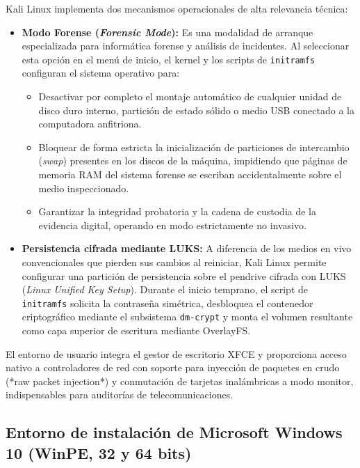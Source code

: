 \documentclass[12pt]{article}
\begin{document}
Kali Linux implementa dos mecanismos operacionales de alta relevancia técnica:
\begin{itemize}[noitemsep, topsep=2pt]
    \item \textbf{Modo Forense (\textit{Forensic Mode}):} Es una modalidad de arranque especializada para informática forense y análisis de incidentes. Al seleccionar esta opción en el menú de inicio, el kernel y los scripts de \texttt{initramfs} configuran el sistema operativo para:
    \begin{itemize}[noitemsep, topsep=1pt]
        \item Desactivar por completo el montaje automático de cualquier unidad de disco duro interno, partición de estado sólido o medio USB conectado a la computadora anfitriona.
        \item Bloquear de forma estricta la inicialización de particiones de intercambio (\textit{swap}) presentes en los discos de la máquina, impidiendo que páginas de memoria RAM del sistema forense se escriban accidentalmente sobre el medio inspeccionado.
        \item Garantizar la integridad probatoria y la cadena de custodia de la evidencia digital, operando en modo estrictamente no invasivo.
    \end{itemize}
    \item \textbf{Persistencia cifrada mediante LUKS:} A diferencia de los medios en vivo convencionales que pierden sus cambios al reiniciar, Kali Linux permite configurar una partición de persistencia sobre el pendrive cifrada con LUKS (\textit{Linux Unified Key Setup}). Durante el inicio temprano, el script de \texttt{initramfs} solicita la contraseña simétrica, desbloquea el contenedor criptográfico mediante el subsistema \texttt{dm-crypt} y monta el volumen resultante como capa superior de escritura mediante OverlayFS.
\end{itemize}

El entorno de usuario integra el gestor de escritorio XFCE y proporciona acceso nativo a controladores de red con soporte para inyección de paquetes en crudo (*raw packet injection*) y conmutación de tarjetas inalámbricas a modo monitor, indispensables para auditorías de telecomunicaciones.

\subsection{Entorno de instalación de Microsoft Windows 10 (WinPE, 32 y 64 bits)}
\label{sec:windows10WinPE}
\end{document}
